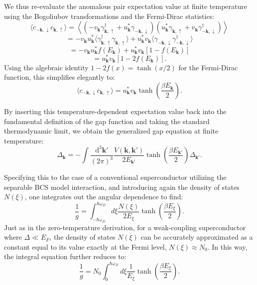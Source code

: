 We thus re-evaluate the anomalous pair expectation value at finite temperature using the Bogoliubov transformations and the Fermi-Dirac statistics:
\[
    \langle c_{-\mathbf{k},\downarrow} c_{\mathbf{k},\uparrow} \rangle = \left\langle \left( -v_{\mathbf{k}} \gamma_{\mathbf{k},\uparrow}^\dagger + u_{\mathbf{k}}^* \gamma_{-\mathbf{k},\downarrow} \right) \left( u_{\mathbf{k}}^* \gamma_{\mathbf{k},\uparrow} + v_{\mathbf{k}} \gamma_{-\mathbf{k},\downarrow}^\dagger \right) \right\rangle
\]
\[
    = -v_{\mathbf{k}} u_{\mathbf{k}}^* \langle \gamma_{\mathbf{k},\uparrow}^\dagger \gamma_{\mathbf{k},\uparrow} \rangle + u_{\mathbf{k}}^* v_{\mathbf{k}} \langle \gamma_{-\mathbf{k},\downarrow} \gamma_{-\mathbf{k},\downarrow}^\dagger \rangle
\]
\[
    = -v_{\mathbf{k}} u_{\mathbf{k}}^* f(E_{\mathbf{k}}) + u_{\mathbf{k}}^* v_{\mathbf{k}} [1 - f(E_{\mathbf{k}})]
\]
\[
    = u_{\mathbf{k}}^* v_{\mathbf{k}} [1 - 2f(E_{\mathbf{k}})].
\]
Using the algebraic identity \( 1 - 2f(x) = \tanh(x/2) \) for the Fermi-Dirac function, this simplifies elegantly to:
\[
    \langle c_{-\mathbf{k},\downarrow} c_{\mathbf{k},\uparrow} \rangle = u_{\mathbf{k}}^* v_{\mathbf{k}} \tanh\left(\frac{\beta E_{\mathbf{k}}}{2}\right).
\]

By inserting this temperature-dependent expectation value back into the fundamental definition of the gap function and taking the standard thermodynamic limit, we obtain the generalized gap equation at finite temperature:
\begin{equation} \label{eq:finite_t_gap_equation}
    \Delta_{\mathbf{k}} = -\int \frac{\mathrm{d}^3\mathbf{k}'}{(2\pi)^3} \frac{V(\mathbf{k}, \mathbf{k}')}{2E_{\mathbf{k}'}} \tanh\left(\frac{\beta E_{\mathbf{k}'}}{2}\right) \Delta_{\mathbf{k}'}.
\end{equation}

Specifying this to the case of a conventional superconductor utilizing the separable BCS model interaction, and introducing again the density of states \( N(\xi) \), one integrates out the angular dependence to find:
\[
    \frac{1}{g} = \int_{-\hbar\omega_D}^{\hbar\omega_D} d\xi \frac{N(\xi)}{2E_{\xi}} \tanh\left(\frac{\beta E_{\xi}}{2}\right).
\]
Just as in the zero-temperature derivation, for a weak-coupling superconductor where \( \Delta \ll E_F \), the density of states \( N(\xi) \) can be accurately approximated as a constant equal to its value exactly at the Fermi level, \( N(\xi) \approx N_0 \). In this way, the integral equation further reduces to:
\[
    \frac{1}{g} = N_0 \int_{0}^{\hbar\omega_D} d\xi \frac{1}{E_{\xi}} \tanh\left(\frac{\beta E_{\xi}}{2}\right).
\]

